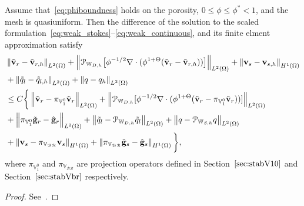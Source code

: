 \begin{lem}
Assume that~\eqref{eq:phiboundness} holds on the porosity, $0\leq \phi \leq \phi^* <1$, and the mesh
is quasiuniform. Then the difference of the solution to the scaled formulation~\eqref{eq:weak_stokes}--\eqref{eq:weak_continuous},
and its finite elment approximation satisfy
\begin{equation}
\begin{aligned}
&\left\lVert\tilde{\mathbf{v}}_r - \tilde{\mathbf{v}}_{r,h}\right\rVert_{L^2(\Omega)} + 
\left\lVert\mathcal{P}_{\mathbb{W}_{D,h}}\big[\phi^{-1/2}\nabla \cdot(\phi^{1+\Theta}(\tilde{\mathbf{v}}_r - \tilde{\mathbf{v}}_{r,h})
)\big]\right\rVert_{L^{2}(\Omega)} + \left\lVert\mathbf{v}_s - \mathbf{v}_{s,h}\right\rVert_{H^1(\Omega)} \\
&+ \left\lVert\tilde{q}_l - \tilde{q}_{l,h}\right\rVert_{L^2(\Omega)} + \left\lVert q - q_h\right\rVert_{L^2(\Omega)} \\
&\leq C \bigg\{\left\lVert\tilde{\mathbf{v}}_r - \pi_{\mathbb{V}_1^0} \tilde{\mathbf{v}}_r\right\rVert_{L^2(\Omega)}  + 
\left\lVert\mathcal{P}_{\mathbb{W}_{D.h}}[\phi^{-1/2}\nabla\cdot(\phi^{1+\Theta}(\tilde{\mathbf{v}}_r - \pi_{\mathbb{V}_1^0}\tilde{\mathbf{v}}_r))]\right\rVert_{L^2(\Omega)}  \\
&+\left\lVert\pi_{\mathbb{V}_1^0}\tilde{\mathbf{g}}_r - \hat{\mathbf{g}}_r\right\rVert_{L^2(\Omega)} + 
\left\lVert\tilde{q}_l - \mathcal{P}_{\mathbb{W}_{D,h}}\tilde{q}_l\right\rVert_{L^2(\Omega)} + \left\lVert q - \mathcal{P}_{\mathbb{W}_{S,h}}q\right\rVert_{L^2(\Omega)}\\ 
&+ \left\lVert\mathbf{v}_s - \pi_{\mathbb{V}_\mathcal{BR}}\mathbf{v}_s\right\rVert_{H^1(\Omega)} + \left\lVert\pi_{\mathbb{V}_\mathcal{BR}}\tilde{\mathbf{g}}_s - \hat{\mathbf{g}}_s \right\rVert_{H^1(\Omega)} \bigg\},
\end{aligned}
\end{equation}
where $\pi_{\mathbb{V}_{1}^0}$ and $\pi_{\mathbb{V}_\mathcal{BR}}$ are projection operators defined in Section~$\ref{sec:stabV10}$ 
and Section~$\ref{sec:stabVbr}$ respectively.
\end{lem}
\begin{proof}
See~\cite{DegenerateDarcy}.
\end{proof}

